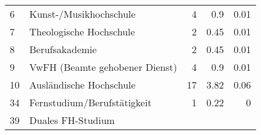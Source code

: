 \begin{longtable}{lXrrr}
     6 &
     \multicolumn{1}{X}{ Kunst-/Musikhochschule   } &


       \num{4} &
       \num[round-mode=places,round-precision=2]{0,9} &
         \num[round-mode=places,round-precision=2]{0,01} \\

     7 &
     \multicolumn{1}{X}{ Theologische Hochschule   } &


       \num{2} &
       \num[round-mode=places,round-precision=2]{0,45} &
         \num[round-mode=places,round-precision=2]{0,01} \\

     8 &
     \multicolumn{1}{X}{ Berufsakademie   } &


       \num{2} &
       \num[round-mode=places,round-precision=2]{0,45} &
         \num[round-mode=places,round-precision=2]{0,01} \\

     9 &
     \multicolumn{1}{X}{ VwFH (Beamte gehobener Dienst)   } &


       \num{4} &
       \num[round-mode=places,round-precision=2]{0,9} &
         \num[round-mode=places,round-precision=2]{0,01} \\

     10 &
     \multicolumn{1}{X}{ Ausländische Hochschule   } &


       \num{17} &
       \num[round-mode=places,round-precision=2]{3,82} &
         \num[round-mode=places,round-precision=2]{0,06} \\

     34 &
     \multicolumn{1}{X}{ Fernstudium/Berufstätigkeit   } &


       \num{1} &
       \num[round-mode=places,round-precision=2]{0,22} &
         \num[round-mode=places,round-precision=2]{0} \\

     39 &
     \multicolumn{1}{X}{ Duales FH-Studium   } &



\end{longtable}
